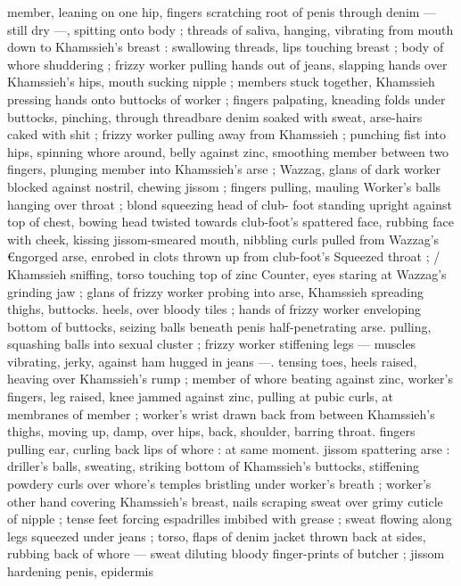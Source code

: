 member, leaning on one hip, fingers scratching root of penis through 
denim --- still dry ---, spitting onto body ; threads of saliva, hanging, 
vibrating from mouth down to Khamssieh's breast : swallowing 
threads, lips touching breast ; body of whore shuddering ; frizzy 
worker pulling hands out of jeans, slapping hands over Khamssieh's 
hips, mouth sucking nipple ; members stuck together, Khamssieh 
pressing hands onto buttocks of worker ; fingers palpating, kneading 
folds under buttocks, pinching, through threadbare denim soaked 
with sweat, arse-hairs caked with shit ; frizzy worker pulling away 
from Khamssieh ; punching fist into hips, spinning whore around, 
belly against zinc, smoothing member between two fingers, plunging 
member into Khamssieh's arse ; Wazzag, glans of dark worker 
blocked against nostril, chewing jissom ; fingers pulling, mauling 
Worker's balls hanging over throat ; blond squeezing head of club- 
foot standing upright against top of chest, bowing head twisted 
towards club-foot's spattered face, rubbing face with cheek, kissing 
jissom-smeared mouth, nibbling curls pulled from Wazzag's 
€ngorged arse, enrobed in clots thrown up from club-foot's 
Squeezed throat ; {\slash} Khamssieh sniffing, torso touching top of zinc 
Counter, eyes staring at Wazzag's grinding jaw ; glans of frizzy 
worker probing into arse, Khamssieh spreading thighs, buttocks. 
heels, over bloody tiles ; hands of frizzy worker enveloping bottom 
of buttocks, seizing balls beneath penis half-penetrating arse. 
pulling, squashing balls into sexual cluster ; frizzy worker stiffening 
legs --- muscles vibrating, jerky, against ham hugged in jeans ---. 
tensing toes, heels raised, heaving over Khamssieh's rump ; member 
of whore beating against zinc, worker's fingers, leg raised, knee 
jammed against zinc, pulling at pubic curls, at membranes of 
member ; worker's wrist drawn back from between Khamssieh's 
thighs, moving up, damp, over hips, back, shoulder, barring throat. 
fingers pulling ear, curling back lips of whore : at same moment. 
jissom spattering arse : driller's balls, sweating, striking bottom of 
Khamssieh's buttocks, stiffening powdery curls over whore's temples 
bristling under worker's breath ; worker's other hand covering 
Khamssieh's breast, nails scraping sweat over grimy cuticle of nipple 
; tense feet forcing espadrilles imbibed with grease ; sweat flowing 
along legs squeezed under jeans ; torso, flaps of denim jacket 
thrown back at sides, rubbing back of whore --- sweat diluting 
bloody finger-prints of butcher ; jissom hardening penis, epidermis 
